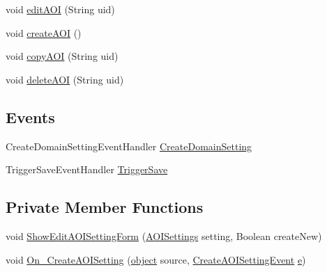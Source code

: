 \begin{DoxyCompactItemize}
\item 
void \hyperlink{class_web_analyzer_1_1_u_i_1_1_interaction_objects_1_1_domain_setting_control_aaffb07c5ebd6252c650723134ac9c0f4}{edit\+A\+O\+I} (String uid)
\item 
void \hyperlink{class_web_analyzer_1_1_u_i_1_1_interaction_objects_1_1_domain_setting_control_a26803d2f4b4e6d9b3b9746d245d45190}{create\+A\+O\+I} ()
\item 
void \hyperlink{class_web_analyzer_1_1_u_i_1_1_interaction_objects_1_1_domain_setting_control_ade3c26de20eec061fccdbad1e33966e1}{copy\+A\+O\+I} (String uid)
\item 
void \hyperlink{class_web_analyzer_1_1_u_i_1_1_interaction_objects_1_1_domain_setting_control_a9eb07ab9de98ec5b9f4d2ef662fa2970}{delete\+A\+O\+I} (String uid)
\end{DoxyCompactItemize}
\subsection*{Events}
\begin{DoxyCompactItemize}
\item 
Create\+Domain\+Setting\+Event\+Handler \hyperlink{class_web_analyzer_1_1_u_i_1_1_interaction_objects_1_1_domain_setting_control_aff18f63d7e7cb4b8c5d62b881bfc685c}{Create\+Domain\+Setting}
\item 
Trigger\+Save\+Event\+Handler \hyperlink{class_web_analyzer_1_1_u_i_1_1_interaction_objects_1_1_domain_setting_control_a1daa9c774e823427b39110bc42ff0ccd}{Trigger\+Save}
\end{DoxyCompactItemize}
\subsection*{Private Member Functions}
\begin{DoxyCompactItemize}
\item 
void \hyperlink{class_web_analyzer_1_1_u_i_1_1_interaction_objects_1_1_domain_setting_control_a8482d6c6ca6f62a8182b8b9e7608ed92}{Show\+Edit\+A\+O\+I\+Setting\+Form} (\hyperlink{class_web_analyzer_1_1_models_1_1_settings_model_1_1_a_o_i_settings}{A\+O\+I\+Settings} setting, Boolean create\+New)
\item 
void \hyperlink{class_web_analyzer_1_1_u_i_1_1_interaction_objects_1_1_domain_setting_control_ab03466aaad4776710ba6517f80329b12}{On\+\_\+\+Create\+A\+O\+I\+Setting} (\hyperlink{_u_i_2_h_t_m_l_resources_2js_2lib_2underscore_8min_8js_aae18b7515bb2bc4137586506e7c0c903}{object} source, \hyperlink{class_web_analyzer_1_1_events_1_1_create_a_o_i_setting_event}{Create\+A\+O\+I\+Setting\+Event} \hyperlink{_u_i_2_h_t_m_l_resources_2js_2lib_2bootstrap_8min_8js_ab5902775854a8b8440bcd25e0fe1c120}{e})
\end{DoxyCompactItemize}
